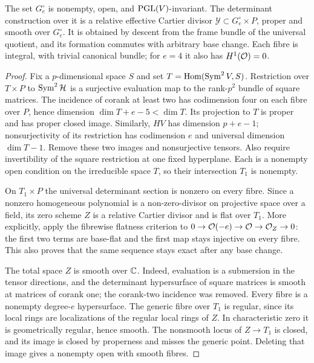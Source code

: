 \begin{proposition}\label{prop:relative-open}
The set $G_e^\circ$ is nonempty, open, and $\operatorname{PGL}(V)$-invariant.
The determinant construction over it is a relative effective Cartier
divisor $\mathcal Y\subset G_e^\circ\times P$, proper and smooth
over $G_e^\circ$. It is obtained by descent from the frame bundle of
the universal quotient, and its formation commutes with arbitrary base
change. Each fibre is integral, with trivial canonical bundle; for
$e=4$ it also has $H^1(\mathcal O)=0$.
\end{proposition}
\begin{proof}
Fix a $p$-dimensional space $S$ and set
$T=\operatorname{Hom}(\operatorname{Sym}^2V,S)$. Restriction over $T\times P$ to
$\operatorname{Sym}^2\mathcal H$ is a surjective evaluation map to the rank-$p^2$
bundle of square matrices. The incidence of corank at least two has
codimension four on each fibre over $P$, hence dimension
$\dim T+e-5<\dim T$. Its projection to $T$ is proper and has proper
closed image. Similarly, $HV$ has dimension $p+e-1$; nonsurjectivity
of its restriction has codimension $e$ and universal dimension
$\dim T-1$. Remove these two images and nonsurjective tensors.
Also require invertibility of the square restriction at one fixed
hyperplane. Each is a nonempty open condition on the irreducible
space $T$, so their intersection $T_1$ is nonempty.

On $T_1\times P$ the universal determinant section is nonzero on
every fibre. Since a nonzero homogeneous polynomial is a non-zero-divisor
on projective space over a field, its zero scheme $Z$ is a relative
Cartier divisor and is flat over $T_1$. More explicitly, apply the
fibrewise flatness criterion to
$0\to\mathcal O(-e)\to\mathcal O\to\mathcal O_Z\to0$: the first two terms are base-flat
and the first map stays injective on every fibre. This also proves
that the same sequence stays exact after any base change.

The total space $Z$ is smooth over $\mathbb C$. Indeed, evaluation is a
submersion in the tensor directions, and the determinant hypersurface
of square matrices is smooth at matrices of corank one; the corank-two
incidence was removed. Every fibre is a nonempty degree-$e$
hypersurface. The generic fibre over $T_1$ is regular, since its local
rings are localizations of the regular local rings of $Z$. In
characteristic zero it is geometrically regular, hence smooth. The
nonsmooth locus of $Z\to T_1$ is closed, and its image is closed by
properness and misses the generic point. Deleting that image gives a
nonempty open with smooth fibres.


\end{proof}
